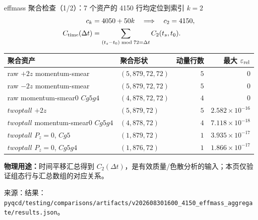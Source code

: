 \documentclass[UTF8,aspectratio=169,11pt]{ctexbeamer}
\newcommand{\source}[1]{\vspace{0.05em}\par{\raggedright\scriptsize\color{muted}来源：#1\par}}
\newcommand{\codepath}[1]{\nolinkurl{#1}}
\begin{document}
\begin{frame}[t]{effmass 聚合检查（1/2）：7 个资产的 4150 行均定位到索引 $k=2$}
  \footnotesize
  \begin{align*}
    c_k&=4050+50k\quad\Longrightarrow\quad c_2=4150,\\
    C_{\rm time}(\Delta t)&=\sum_{(t_s-t_0)\bmod72=\Delta t}C_2(t_s,t_0).
  \end{align*}
  \begin{tabularx}{0.96\textwidth}{@{}Y l r r@{}}
    \toprule
    聚合资产 & 聚合形状 & 动量行数 & 最大 $\varepsilon_{\rm rel}$ \\
    \midrule
    raw $+2z$ momentum-smear & $(5,879,72,72)$ & $5$ & $0$ \\
    raw $-2z$ momentum-smear & $(5,879,72,72)$ & $5$ & $0$ \\
    raw momentum-smear0 $Cg5g4$ & $(4,878,72,72)$ & $4$ & $0$ \\
    $twoptall$ $+2z$ & $(5,879,72)$ & $5$ & $2.582\times10^{-16}$ \\
    $twoptall$ momentum-smear0 $Cg5g4$ & $(4,878,72)$ & $4$ & $7.118\times10^{-18}$ \\
    $twoptall$ $P_z=0$, $Cg5$ & $(1,879,72)$ & $1$ & $3.935\times10^{-17}$ \\
    $twoptall$ $P_z=0$, $Cg5g4$ & $(1,876,72)$ & $1$ & $1.866\times10^{-17}$ \\
    \bottomrule
  \end{tabularx}
  \par\vspace{0.12em}
  {\scriptsize
  \textbf{物理用途：}时间平移汇总得到 $C_2(\Delta t)$，是有效质量/色散分析的输入；本页仅验证组态行与汇总数组的对应关系。\par}
  \source{结果：\codepath{pyqcd/testing/comparisons/artifacts/v202608301600_4150_effmass_aggregate/results.json}。}
\end{frame}
\end{document}
